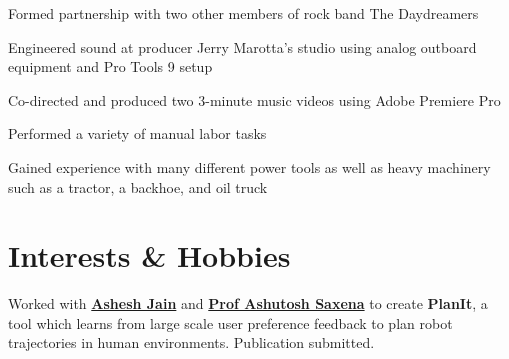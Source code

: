 \documentclass[letterpaper]{deedy-resume} %
\begin{document}
\begin{minipage}[t]{0.66\textwidth}
\begin{tightitemize}
\end{tightitemize}

\sectionspace %



\begin{tightitemize}
\item Formed partnership with two other members of rock band The Daydreamers
\item Engineered sound at producer Jerry Marotta’s studio using analog outboard equipment and Pro Tools 9 setup
\item Co-directed and produced two 3-minute music videos using Adobe Premiere Pro

\end{tightitemize}

\sectionspace %



\begin{tightitemize}
\item Performed a variety of manual labor tasks
\item Gained experience with many different power tools as well as heavy machinery such as a tractor, a backhoe, and oil truck

\end{tightitemize}

\sectionspace %


\section{Interests \& Hobbies}


Worked with \textbf{\href{http://www.cs.cornell.edu/~ashesh/}{Ashesh Jain}} and \textbf{\href{http://www.cs.cornell.edu/~asaxena/}{Prof Ashutosh Saxena}} to create \textbf{PlanIt}, a tool which learns from large scale user preference feedback to plan robot trajectories in human environments. Publication submitted.


\end{minipage}
\end{document}
